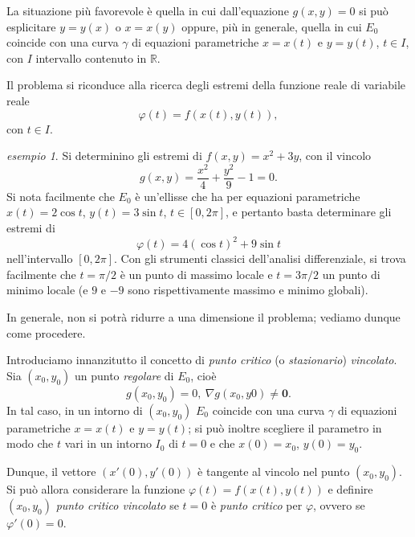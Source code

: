 \documentclass[a4paper]{book}
\numberwithin{equation}{section}
\renewcommand{\phi}{\varphi}
\theoremstyle{plain}
\theoremstyle{definition}
\theoremstyle{remark}
\renewcommand{\vec}{\boldsymbol}
\theoremstyle{example}
\newtheorem{exmp}{esempio}[section]
\begin{document}
	La situazione più favorevole è quella in cui dall'equazione $g(x, y) = 0$ si può esplicitare $y = y(x)$ o $x = x(y)$ oppure, più in generale, quella in cui $E_0$ coincide con una curva $\gamma$ di equazioni parametriche $x = x(t)$ e $y = y(t)$, $t \in I$, con $I$ intervallo contenuto in $\mathbb{R}$.

	Il problema si riconduce alla ricerca degli estremi della funzione reale di variabile reale
	\begin{equation*}
		\phi (t) = f(x(t), y(t)),
	\end{equation*}
	con $t \in I$.

	\begin{exmp}
		Si determinino gli estremi di $f(x, y) = x^2 + 3y$, con il vincolo
		\begin{equation*}
			g(x,y) = \frac{x^2}{4} + \frac{y^2}{9} - 1 = 0.
		\end{equation*}
		Si nota facilmente che $E_0$ è un'ellisse che ha per equazioni parametriche $x(t) = 2 \cos{t}$, $y(t) = 3\sin{t}$, $t \in [0, 2 \pi]$, e pertanto basta determinare gli estremi di
		\begin{equation*}
			\phi(t) = 4(\cos{t})^2 + 9\sin{t}
		\end{equation*}
		nell'intervallo $[0, 2\pi]$. Con gli strumenti classici dell'analisi differenziale, si trova facilmente che $t= \pi/2$ è un punto di massimo locale e $t = 3\pi/2$ un punto di minimo locale (e $9$ e $-9$ sono rispettivamente massimo e minimo globali).
	\end{exmp}

	In generale, non si potrà ridurre a una dimensione il problema; vediamo dunque come procedere.

	Introduciamo innanzitutto il concetto di \emph{punto critico} (o \emph{stazionario}) \emph{vincolato}. Sia $(x_0, y_0)$ un punto \emph{regolare} di $E_0$, cioè
	\begin{equation*}
		g(x_0, y_0) = 0, \ \nabla g(x_0, y0) \ne \vec{0}.
	\end{equation*}
	In tal caso, in un intorno di $(x_0, y_0)$ $E_0$ coincide con una curva $\gamma$ di equazioni parametriche $x = x(t)$ e $y = y(t)$; si può inoltre scegliere il parametro in modo che $t$ vari in un intorno $I_0$ di $t = 0$ e che $x(0) = x_0$, $y(0) = y_0$.

	Dunque, il vettore $(x'(0), y'(0))$ è tangente al vincolo nel punto $(x_0, y_0)$. Si può allora considerare la funzione $\phi(t) = f(x(t), y(t))$ e definire $(x_0, y_0)$ \emph{punto critico vincolato} se $t = 0$ è \emph{punto critico} per $\phi$, ovvero se $\phi'(0) = 0$.
\end{document}
